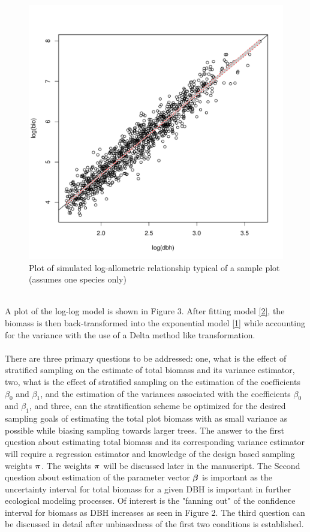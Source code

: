 \documentclass[fleqn]{article}
\def\bm#1{\mbox{\boldmath $#1$}}
\begin{document}
  \begin{figure}
    \centering
    \caption{Plot of simulated log-allometric relationship typical of a sample plot (assumes one species only)}
    \includegraphics[scale = 0.5]{dbhLogModel}
  \end{figure}
\\   
A plot of the log-log model is shown in Figure 3. After fitting model \eqref{2}, the biomass is then back-transformed into the exponential model \eqref{1} while accounting for the variance with the use of a Delta method like transformation.\\
\\
  There are three primary questions to be addressed: one, what is the effect of stratified sampling on the estimate of total biomass and its variance estimator, two, what is the effect of stratified sampling on the estimation of the coefficients $\beta_0$ and $\beta_1$, and the estimation of the variances associated with the coefficients $\beta_0$ and $\beta_1$, and three, can the stratification scheme be optimized for the desired sampling goals of estimating the total plot biomass with as small variance as possible while biasing sampling towards larger trees.  The answer to the first question about estimating total biomass and its corresponding variance estimator will require a regression estimator and knowledge of the design based sampling weights $\bm{\pi}$. The weights $\bm{\pi}$ will be discussed later in the manuscript. The Second question about estimation of the parameter vector $\bm{\beta}$ is important as the uncertainty interval for total biomass for a given DBH is important in further ecological modeling processes. Of interest is the "fanning out" of the confidence interval for biomass as DBH increases as seen in Figure 2. The third question can be discussed in detail after unbiasedness of the first two conditions is established.
%
\end{document}
